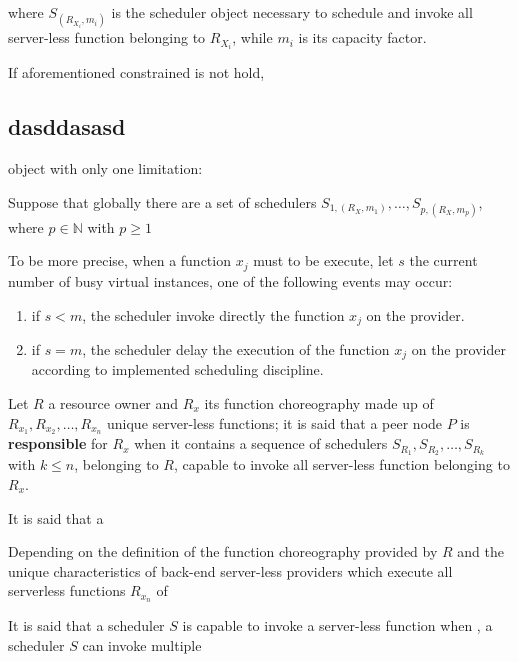 \documentclass[10pt,a4paper]{article}
\begin{document}
where $S_{({R_{X_i}},m_i)}$ is the scheduler object necessary to schedule and invoke all server-less function belonging to $R_{X_i}$, while $m_i$ is its capacity factor. 

If aforementioned constrained is not hold, 

\subsection{dasddasasd}







 object with only one limitation:

Suppose that globally there are a set of schedulers $S_{1,({R_{X}},m_1)}, \ldots , S_{p,({R_{X}},m_p)}$, where $p \in \mathbb{N}$ with $p \geq 1$



To be more precise, when a function $x_j$ must to be execute, let $s$ the current number of busy virtual instances, one of the following events may occur:
\begin{enumerate}
\item if $s < m$, the scheduler invoke directly the function $x_j$ on the provider.
\item if $s = m$, the scheduler delay the execution of the function $x_j$ on the provider according to implemented scheduling discipline.
\end{enumerate}








Let $R$ a resource owner and $R_x$ its function choreography made up of $R_{x_1}, R_{x_2}, \ldots, R_{x_n}$ unique server-less functions; it is said that a peer node $P$ is \textbf{responsible} for $R_x$ when it contains a sequence of schedulers $S_{R_1}, S_{R_2}, \ldots, S_{R_k}$ with $k \leq n$, belonging to $R$, capable to invoke all server-less function belonging to $R_x$. 

It is said that a 

Depending on the definition of the function choreography provided by $R$ and the unique characteristics of back-end server-less providers which execute all serverless functions $R_{x_n}$ of 




It is said that a scheduler $S$ is capable to invoke a server-less function when 
, a scheduler $S$ can invoke multiple
\end{document}
